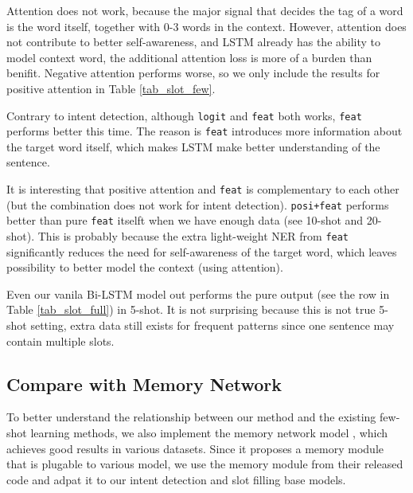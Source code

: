 Attention does not work, because the major signal that decides the tag of a word is the word itself, together with 0-3 words in the context. However, attention does not contribute to better self-awareness, and LSTM already has the ability to model context word, the additional attention loss is more of a burden than benifit. Negative attention performs worse, so we only include the results for positive attention in Table \ref{tab_slot_few}.

Contrary to intent detection, although \texttt{logit} and \texttt{feat} both works, \texttt{feat} performs better this time. The reason is \texttt{feat} introduces more information about the target word itself, which makes LSTM make better understanding of the sentence.

It is interesting that positive attention and \texttt{feat} is complementary to each other (but the combination does not work for intent detection). \texttt{posi+feat} performs better than pure \texttt{feat} itselft when we have enough data (see 10-shot and 20-shot). This is probably because the extra light-weight NER from \texttt{feat} significantly reduces the need for self-awareness of the target word, which leaves possibility to better model the context (using attention).

Even our vanila Bi-LSTM model out performs the pure \RE output (see the \RE row in Table \ref{tab_slot_full}) in 5-shot. It is not surprising because this is not true 5-shot setting, extra data still exists for frequent patterns since one sentence may contain multiple slots.


\subsection{Compare with Memory Network}
To better understand the relationship between our method and the existing few-shot learning methods, we also implement the memory network model \cite{kaiser2017learning}, which achieves good results in various datasets. Since it proposes a memory module that is plugable to various model, we use the memory module from their released code and adpat it to our intent detection and slot filling base models.

